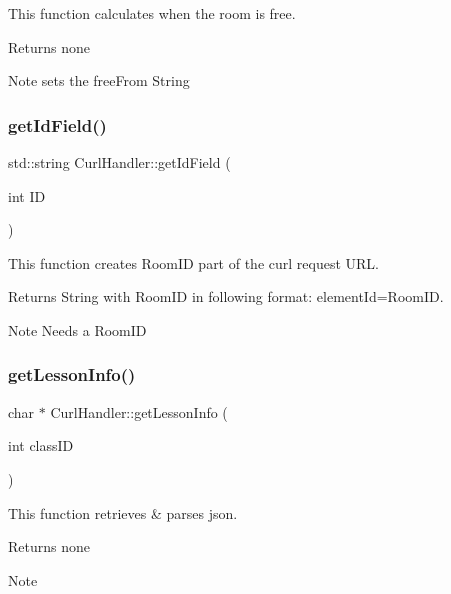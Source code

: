 This function calculates when the room is free. 

\begin{DoxyReturn}{Returns}
none 
\end{DoxyReturn}
\begin{DoxyNote}{Note}
sets the free\+From String 
\end{DoxyNote}
\mbox{\label{classCurlHandler_a26d8a6f384d54fd7af70fde33232531a}} 
\subsubsection{\texorpdfstring{get\+Id\+Field()}{getIdField()}}
{\footnotesize\ttfamily std\+::string Curl\+Handler\+::get\+Id\+Field (\begin{DoxyParamCaption}\item[{int}]{ID }\end{DoxyParamCaption})}



This function creates Room\+ID part of the curl request U\+RL. 

\begin{DoxyReturn}{Returns}
String with Room\+ID in following format\+: element\+Id=Room\+ID. 
\end{DoxyReturn}
\begin{DoxyNote}{Note}
Needs a Room\+ID 
\end{DoxyNote}
\mbox{\label{classCurlHandler_a8f82086fdc6993eb9068a25632652fb0}} 
\subsubsection{\texorpdfstring{get\+Lesson\+Info()}{getLessonInfo()}}
{\footnotesize\ttfamily char $\ast$ Curl\+Handler\+::get\+Lesson\+Info (\begin{DoxyParamCaption}\item[{int}]{class\+ID }\end{DoxyParamCaption})}



This function retrieves \& parses json. 

\begin{DoxyReturn}{Returns}
none 
\end{DoxyReturn}
\begin{DoxyNote}{Note}

\end{DoxyNote}
\mbox{\label{classCurlHandler_acd45a047ecf8bad0977f8e890914a59a}} 
